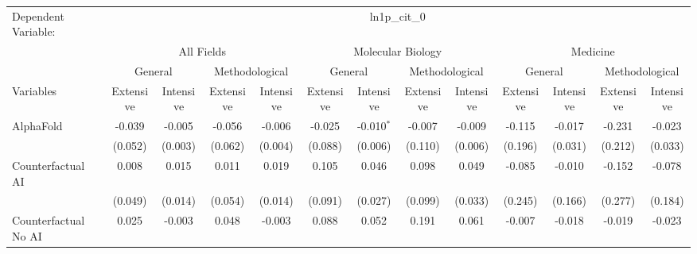 \begingroup
\centering
\begin{tabular}{lcccccccccccc}
   \tabularnewline \midrule \midrule
   Dependent Variable: & \multicolumn{12}{c}{ln1p\_cit\_0}\\
 & \multicolumn{4}{c}{All Fields} & \multicolumn{4}{c}{Molecular Biology} & \multicolumn{4}{c}{Medicine} \\
\cmidrule(lr){2-5} \cmidrule(lr){6-9} \cmidrule(lr){10-13}
 & \multicolumn{2}{c}{General} & \multicolumn{2}{c}{Methodological} & \multicolumn{2}{c}{General} & \multicolumn{2}{c}{Methodological} & \multicolumn{2}{c}{General} & \multicolumn{2}{c}{Methodological} \\
\cmidrule(lr){2-3} \cmidrule(lr){4-5} \cmidrule(lr){6-7} \cmidrule(lr){8-9} \cmidrule(lr){10-11} \cmidrule(lr){12-13}
Variables & \multicolumn{1}{c}{Extensive} & \multicolumn{1}{c}{Intensive} & \multicolumn{1}{c}{Extensive} & \multicolumn{1}{c}{Intensive} & \multicolumn{1}{c}{Extensive} & \multicolumn{1}{c}{Intensive} & \multicolumn{1}{c}{Extensive} & \multicolumn{1}{c}{Intensive} & \multicolumn{1}{c}{Extensive} & \multicolumn{1}{c}{Intensive} & \multicolumn{1}{c}{Extensive} & \multicolumn{1}{c}{Intensive} \\
\cmidrule(lr){1-1}\cmidrule(lr){2-2} \cmidrule(lr){3-3} \cmidrule(lr){4-4} \cmidrule(lr){5-5} \cmidrule(lr){6-6} \cmidrule(lr){7-7} \cmidrule(lr){8-8} \cmidrule(lr){9-9} \cmidrule(lr){10-10} \cmidrule(lr){11-11} \cmidrule(lr){12-12} \cmidrule(lr){13-13}
   AlphaFold                                & -0.039  & -0.005   & -0.056  & -0.006   & -0.025  & -0.010$^{*}$ & -0.007  & -0.009        & -0.115  & -0.017  & -0.231  & -0.023\\   
                                            & (0.052) & (0.003)  & (0.062) & (0.004)  & (0.088) & (0.006)      & (0.110) & (0.006)       & (0.196) & (0.031) & (0.212) & (0.033)\\   
   Counterfactual AI                        & 0.008   & 0.015    & 0.011   & 0.019    & 0.105   & 0.046        & 0.098   & 0.049         & -0.085  & -0.010  & -0.152  & -0.078\\   
                                            & (0.049) & (0.014)  & (0.054) & (0.014)  & (0.091) & (0.027)      & (0.099) & (0.033)       & (0.245) & (0.166) & (0.277) & (0.184)\\   
   Counterfactual No AI                     & 0.025   & -0.003   & 0.048   & -0.003   & 0.088   & 0.052        & 0.191   & 0.061         & -0.007  & -0.018  & -0.019  & -0.023\\   

\end{tabular}
